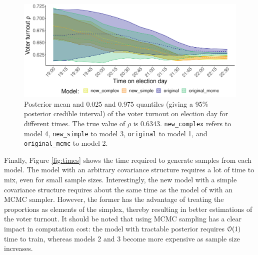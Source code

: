\documentclass{article}
\begin{document}
\begin{figure}[h]
  \centering
  \includegraphics[width=\textwidth]{../fig/part2.pdf}
  \caption{Posterior mean and 0.025 and 0.975 quantiles (giving a 95\% posterior credible interval) of the voter turnout on election day for different times. The true value of $\rho$ is 0.6343. \texttt{new\_complex} refers to model 4, \texttt{new\_simple} to model 3, \texttt{original} to model 1, and \texttt{original\_mcmc} to model 2.}
  \label{fig:part}
\end{figure}





Finally, Figure \ref{fig:times} shows the time required to generate samples from each model. The model with an arbitrary covariance structure requires a lot of time to mix, even for small sample sizes. Interestingly, the new model with a simple covariance structure requires about the same time as the model of \citet{diluvi2018} with an MCMC sampler. However, the former has the advantage of treating the proportions as elements of the simplex, thereby resulting in better estimations of the voter turnout. It should be noted that using MCMC sampling has a clear impact in computation cost: the model with tractable posterior requires $\mathcal{O}(1)$ time to train, whereas models 2 and 3 become more expensive as sample size increases.
\end{document}
